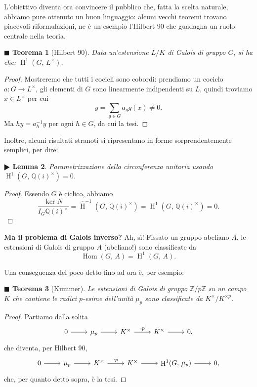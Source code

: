 \documentclass[a4paper]{article}
\newtheorem{theorem}{$ \blacksquare $ Teorema}
\newtheorem{lemma}[theorem]{$ \RHD $ Lemma}
\theoremstyle{remark}
\theoremstyle{definition}
\newcommand{\Z}{\mathbb{Z}}
\newcommand{\Q}{\mathbb{Q}}
\DeclareMathOperator{\Hom}{Hom}
\DeclareMathOperator{\HH}{H}
\begin{document}
L'obiettivo diventa ora convincere il pubblico che, fatta la scelta naturale, abbiamo pure ottenuto un buon linguaggio: alcuni vecchi teoremi trovano piacevoli riformulazioni, ne è un esempio l'Hilbert 90 che guadagna un ruolo centrale nella teoria.
\begin{theorem}[Hilbert 90]
	Data un'estensione $ L/K $ di Galois di gruppo $ G $, si ha che: $ \HH^1(G, \, L^\times) $.
\end{theorem}
\begin{proof}
	Mostreremo che tutti i cocicli sono cobordi: prendiamo un cociclo $ a \colon G \to L^\times $, gli elementi di $ G $ sono linearmente indipendenti su $ L $, quindi troviamo $ x \in L^\times $ per cui
	\[ y = \sum_{g \in G} a_g g(x) \neq 0. \]
	Ma $ hy = a_h^{-1}y $ per ogni $ h \in G $, da cui la tesi.
\end{proof}

Inoltre, alcuni risultati stranoti si ripresentano in forme sorprendentemente semplici, per dire:

\begin{lemma}
	Parametrizzazione della circonferenza unitaria usando $ \HH^1(G,\, \Q(i)^\times) = 0 $.
\end{lemma}
\begin{proof}
	Essendo $ G $ è ciclico, abbiamo
	\[ \frac{\ker N}{I_G \Q(i)^\times} = \hat{\HH}^{-1}(G, \, \Q(i)^\times) = \HH^1(G, \, \Q(i)^\times) = 0. \]
\end{proof}


\textbf{Ma il problema di Galois inverso?} Ah, sì! Fissato un gruppo abeliano $ A $, le estensioni di Galois di gruppo $ A $ (abeliano!) sono classificate da
\[ \Hom(G,\, A) = \HH^1(G, \, A). \]

Una conseguenza del poco detto fino ad ora è, per esempio:

\begin{theorem}[Kummer]
	Le estensioni di Galois di gruppo $ \Z/p\Z $ su un campo $ K $ che contiene le radici $ p $-esime dell'unità $ \mu_p $ sono classificate da $ K^\times / K^{\times p} $.
\end{theorem}
\begin{proof}
	Partiamo dalla solita
	\[ \begin{tikzcd}
	0 \rar & \mu_p \rar & \bar{K}^\times \rar["\cdot p"] & \bar{K}^\times \rar & 0,
	\end{tikzcd} \]
	che diventa, per Hilbert 90, 
	\[ \begin{tikzcd}
	0 \rar & \mu_p \rar & K^\times \rar["\cdot p"] & K^\times \rar & \HH^1(G, \, \mu_p) \rar & 0,
	\end{tikzcd} \]
	che, per quanto detto sopra, è la tesi.
\end{proof}
\end{document}
